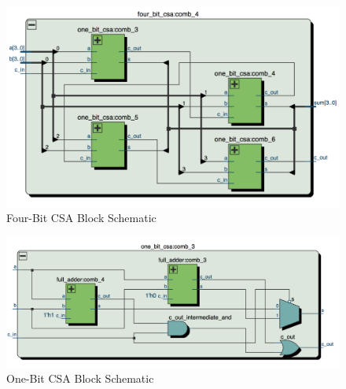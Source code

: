 \documentclass[journal, twocolumn, final,11pt,letterpaper]{IEEEtran}
\begin{document}
\begin{figure} [htbp]
	\centering
	\includegraphics[scale=0.4]{four-bit-csa-block-schematic.png}
	\caption{Four-Bit CSA Block Schematic\label{fig:four-bit-csa-block-schematic}}
\end{figure}

\begin{figure} [htbp]
	\centering
	\includegraphics[scale=0.4]{one-bit-csa-block-schematic.png}
	\caption{One-Bit CSA Block Schematic\label{fig:one-bit-csa-block-schematic}}
\end{figure}




\end{document}
